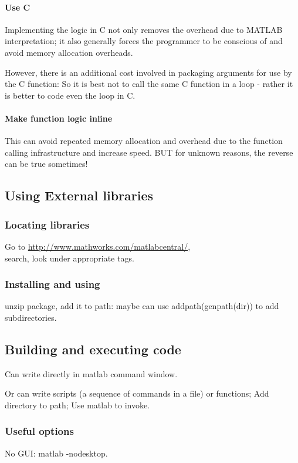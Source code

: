 \documentclass[oneside, article]{memoir}
\begin{document}
\paragraph{Use C}
Implementing the logic in C not only removes the overhead due to MATLAB interpretation; it also generally forces the programmer to be conscious of and avoid memory allocation overheads.

However, there is an additional cost involved in packaging arguments for use by the C function: So it is best not to call the same C function in a loop - rather it is better to code even the loop in C.

\paragraph{Make function logic inline}
This can avoid repeated memory allocation and overhead due to the function calling infrastructure and increase speed. BUT for unknown reasons, the reverse can be true sometimes!

\subsection{Using External libraries}
\subsubsection{Locating libraries}
Go to \url{http://www.mathworks.com/matlabcentral/}, \\ search, look under appropriate tags.

\subsubsection{Installing and using}
unzip package, add it to path: maybe can use addpath(genpath(dir)) to add subdirectories.


\subsection{Building and executing code}
Can write directly in matlab command window.

Or can write scripts (a sequence of commands in a file) or functions; Add directory to path; Use matlab to invoke.

\subsubsection{Useful options}
No GUI: matlab -nodesktop.
\end{document}
